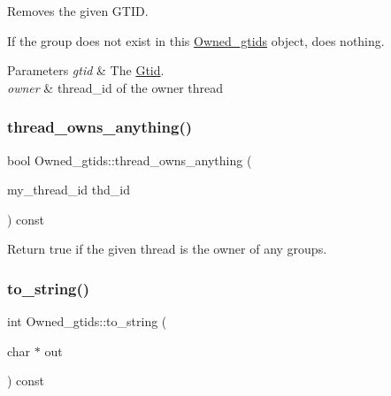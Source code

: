 Removes the given G\+T\+ID.

If the group does not exist in this \mbox{\hyperlink{classOwned__gtids}{Owned\+\_\+gtids}} object, does nothing.


\begin{DoxyParams}{Parameters}
{\em gtid} & The \mbox{\hyperlink{structGtid}{Gtid}}. \\
\hline
{\em owner} & thread\+\_\+id of the owner thread \\
\hline
\end{DoxyParams}
\mbox{\label{classOwned__gtids_a2dc24132eb1138e5c291da8db213e47c}} 
\subsubsection{\texorpdfstring{thread\+\_\+owns\+\_\+anything()}{thread\_owns\_anything()}}
{\footnotesize\ttfamily bool Owned\+\_\+gtids\+::thread\+\_\+owns\+\_\+anything (\begin{DoxyParamCaption}\item[{my\+\_\+thread\+\_\+id}]{thd\+\_\+id }\end{DoxyParamCaption}) const\hspace{0.3cm}{\ttfamily [inline]}}

Return true if the given thread is the owner of any groups. \mbox{\label{classOwned__gtids_a746e2bc47416a49a418fa6dd0abb8421}} 
\subsubsection{\texorpdfstring{to\+\_\+string()}{to\_string()}\hspace{0.1cm}{\footnotesize\ttfamily [1/2]}}
{\footnotesize\ttfamily int Owned\+\_\+gtids\+::to\+\_\+string (\begin{DoxyParamCaption}\item[{char $\ast$}]{out }\end{DoxyParamCaption}) const\hspace{0.3cm}{\ttfamily [inline]}}

